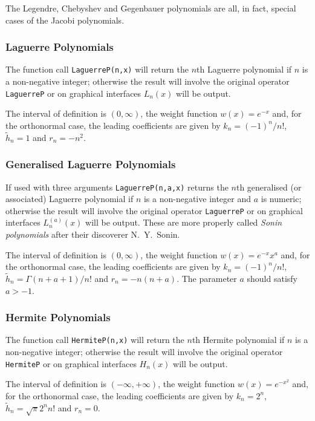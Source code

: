 The Legendre, Chebyshev and Gegenbauer polynomials are all, in fact, special
cases of the Jacobi polynomials.

\subsubsection{Laguerre Polynomials}
\hypertarget{LAGUERREP}{}
The function call \texttt{LaguerreP(n,x)} will return the $n$th Laguerre
polynomial if $n$ is a non-negative integer; otherwise the result will involve
the original operator \texttt{LaguerreP} or on graphical interfaces $L_n(x)$
will be output.

The interval of definition is $(0, \infty)$, the weight function
$w(x)=e^{-x}$ and, for the orthonormal case, the leading coefficients
are given by $k_n=(-1)^n/n!$, $\tilde{h}_n =1$ and $r_n = -n^2$.

\subsubsection{Generalised Laguerre Polynomials}
If used with three arguments \texttt{LaguerreP(n,a,x)} returns the $n$th
generalised (or associated) Laguerre polynomial if $n$ is a non-negative
integer and $a$ is numeric; otherwise the result will involve the original
operator \texttt{LaguerreP} or on graphical interfaces $L_n^{(a)}(x)$ will be
output. These are more properly called \emph{Sonin polynomials} after their 
discoverer N.~Y.~Sonin.

The interval of definition is $(0, \infty)$, the weight function
$w(x)=e^{-x}x^a$ and, for the orthonormal case, the leading coefficients
are given by $k_n=(-1)^n/n!$, $\tilde{h}_n = \Gamma(n+a+1)/n!$ and
$r_n=-n(n+a)$. The parameter $a$ should satisfy $a > -1$.

\subsubsection{Hermite Polynomials}
\hypertarget{HERMITEP}{}
The function call \texttt{HermiteP(n,x)} will return the $n$th Hermite
polynomial if $n$ is a non-negative integer; otherwise the result will involve
the original operator \texttt{HermiteP} or on graphical interfaces $H_n(x)$
will be output.

The interval of definition is $(-\infty, +\infty)$, the weight function
$w(x)=e^{-x^2}$ and,
for the orthonormal case, the leading coefficients are given by
$k_n=2^n$, $\tilde{h}_n = \sqrt{\pi}2^nn!$ and $r_n=0$.

